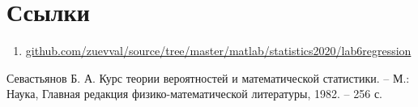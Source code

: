 \documentclass[a4paper,12pt]{article} %
\begin{document}
	
	\tableofcontents \newpage
	\listoffigures
	\listoftables \newpage
	
	
	\section{Ссылки}
	\begin{enumerate}
		\item \href{https://github.com/zuevval/source/tree/master/matlab/statistics2020/lab6regression}{github.com/zuevval/source/tree/master/matlab/statistics2020/lab6regression} \label{link:lab5}
	\end{enumerate}
	
	\begin{thebibliography}{99}
		 Севастьянов Б. А. Курс теории вероятностей и математической статистики. -- М.: Наука, Главная редакция физико-математической литературы, 1982. -- 256 с.
	\end{thebibliography}
\end{document}
